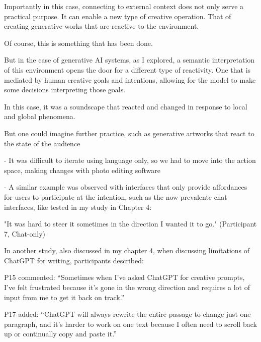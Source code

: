 Importantly in this case, connecting to external context does not only serve a practical purpose. 
It can enable a new type of creative operation. That of creating generative works that are reactive to the environment. 

Of course, this is something that has been done. 

But in the case of generative AI systems, as I explored, a semantic interpretation of this environment opens the door for a different type of reactivity. One that is mediated by human creative goals and intentions, allowing for the model to make some decisions interpreting those goals. 

In this case, it was a soundscape that reacted and changed in response to local and global phenomena. 

But one could imagine further practice, such as generative artworks that react to the state of the audience























- It was difficult to iterate using language only, so we had to move into the action space, making changes with photo editing software

- A similar example was observed with interfaces that only provide affordances for users to participate at the intention, such as the now prevalente chat interfaces, like tested in my study in Chapter 4: 

"It was hard to steer it sometimes in the direction I wanted it to go." (Participant 7, Chat-only)

In another study, also discussed in my chapter 4, when discussing limitations of ChatGPT for writing, participants described: 

P15 commented: “Sometimes when I’ve asked ChatGPT for creative prompts, I’ve felt frustrated because it’s gone in the
wrong direction and requires a lot of input from me to get it back on track.”

P17 added: “ChatGPT will always rewrite the entire passage to change just one paragraph, and it’s harder to work on
one text because I often need to scroll back up or continually copy and paste it.”

